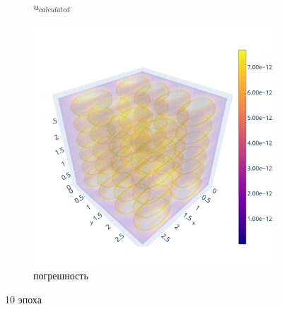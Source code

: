 \documentclass[a4paper,hidelinks,12pt]{article}
\begin{document}
\begin{figure}[H]
\begin{subfigure}{.33\textwidth}
  \caption{$u_{calculated}$}
\end{subfigure}%
\begin{subfigure}{.33\textwidth}
  \centering
  \includegraphics[width=\linewidth]{pictures/10_Lpi_256_diff.png}
  \caption{погрешность}
\end{subfigure}%
\caption{10 эпоха}
\label{fig:fig}
\end{figure}
\end{document}
